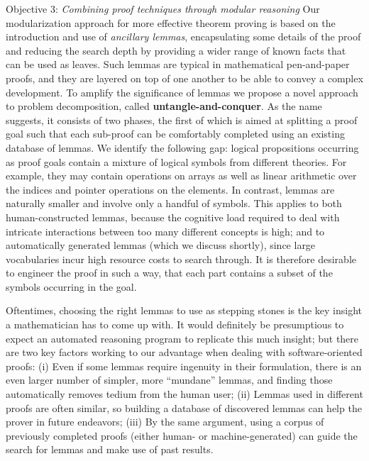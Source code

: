 \begin{paragraph}{Objective 3: {\it Combining proof techniques through modular reasoning}}
Our modularization approach for more effective theorem proving is based on the introduction and use of \emph{ancillary lemmas}, encapsulating some details of the proof and reducing the search depth by providing a wider range of known facts that can be used as leaves.
Such lemmas are typical in mathematical pen-and-paper proofs, and they are layered on top of one another to be able to convey a complex development.
To amplify the significance of lemmas we propose a novel approach to problem decomposition, called \textbf{untangle-and-conquer}.
As the name suggests, it consists of two phases, the first of which is aimed at splitting a proof goal such that each sub-proof can be comfortably completed using an existing database of lemmas.
We identify the following gap: logical propositions occurring as proof goals contain a mixture of logical symbols from different theories.
For example, they may contain operations on arrays as well as linear arithmetic over the indices and pointer operations on the elements.
In contrast, lemmas are naturally smaller and involve only a handful of symbols.
This applies to both human-constructed lemmas, because the cognitive load required to deal with intricate interactions between too many different concepts is high;
and to automatically generated lemmas (which we discuss shortly), since large vocabularies incur high resource costs to search through.
It is therefore desirable to engineer the proof in such a way, that each part contains a subset of the symbols occurring in the goal.


Oftentimes, choosing the right lemmas to use as stepping stones is the key insight a mathematician has to come up with.
It would definitely be presumptious to expect an automated reasoning program to replicate this much insight; but there are two key factors working to our advantage when dealing with software-oriented proofs:
(i) Even if some lemmas require ingenuity in their formulation, there is an even larger number of simpler, more ``mundane'' lemmas, and finding those automatically removes tedium from the human user;
(ii) Lemmas used in different proofs are often similar, 
so building a database of discovered lemmas can help the prover in future endeavors;
(iii) By the same argument, using a corpus of previously completed proofs (either human- or machine-generated) can guide the search for lemmas and make use of past results.


\end{paragraph}

